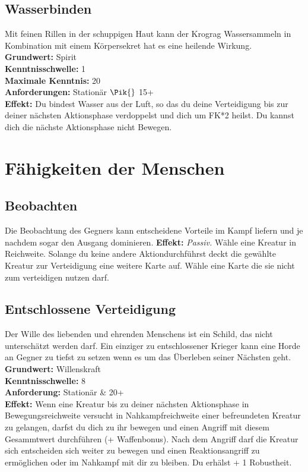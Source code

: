 \subsection*{Wasserbinden} \label{sk:wasserbinden}
Mit feinen Rillen in der schuppigen Haut kann der Krograg Wassersammeln in Kombination mit einem Körpersekret hat es eine heilende Wirkung.\\
\textbf{Grundwert:} Spirit \\
\textbf{Kenntnisschwelle:} 1 \\
\textbf{Maximale Kenntnis:} 20 \\
\textbf{Anforderungen:} Stationär $\Pik{}$ 15+ \\
\textbf{Effekt:} Du bindest Wasser aus der Luft, so das du deine Verteidigung bis zur deiner nächsten Aktionsphase verdoppelst und dich um FK*2 heilst. Du kannst dich die nächste Aktionsphase nicht Bewegen.




\section{Fähigkeiten der Menschen} \label{menschenskills}

\subsection*{Beobachten} \label{sk:beobachten}
Die Beobachtung des Gegners kann entscheidene Vorteile im Kampf liefern und je nachdem sogar den Ausgang dominieren. 
\textbf{Effekt:} \textit{Passiv.} Wähle eine Kreatur in Reichweite. Solange du keine andere Aktiondurchführst deckt die gewählte Kreatur zur Verteidigung eine weitere Karte auf. Wähle eine Karte die sie nicht zum verteidigen nutzen darf.

\subsection*{Entschlossene Verteidigung} \label{entschlosseneverteidigung}
Der Wille des liebenden und ehrenden Menschens ist ein Schild, das nicht unterschätzt werden darf. Ein einziger zu entschlossener Krieger kann eine Horde an Gegner zu tiefst zu setzen wenn es um das Überleben seiner Nächsten geht.\\
\textbf{Grundwert:} Willenskraft \\
\textbf{Kenntnisschwelle:} 8 \\
\textbf{Anforderung:} Stationär \& 20+\\
\textbf{Effekt:} Wenn eine Kreatur bis zu deiner nächsten Aktionsphase in Bewegungsreichweite versucht in Nahkampfreichweite einer befreundeten Kreatur zu gelangen, darfst du dich zu ihr bewegen und einen Angriff mit diesem Gesammtwert durchführen (+ Waffenbonus). Nach dem Angriff darf die Kreatur sich entscheiden sich weiter zu bewegen und einen Reaktionsangriff zu ermöglichen oder im Nahkampf mit dir zu bleiben. Du erhälst + 1 Robustheit.

